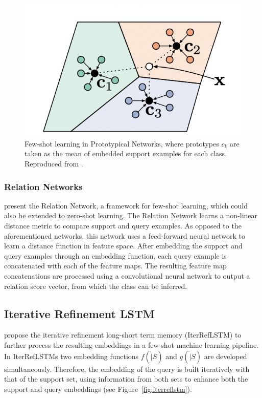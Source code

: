 \begin{figure}[h]
	\centering
	\includegraphics[width=0.7\linewidth]{img/protonets.png}
	\caption{Few-shot learning in Prototypical Networks, where prototypes \textbf{$c_k$} are taken as the mean of embedded support examples for each class. Reproduced from \citet{snell2017prototypical}.}
	\label{fig:protonets}
\end{figure}

\subsubsection{Relation Networks}

\citet{sung2018learning} present the Relation Network, a framework for few-shot learning, which could also be extended to zero-shot learning. The Relation Network learns a non-linear distance metric to compare support and query examples. As opposed to the aforementioned networks, this network uses a feed-forward neural network to learn a distance function in feature space. After embedding the support and query examples through an embedding function, each query example is concatenated with each of the feature maps. The resulting feature map concatenations are processed using a convolutional neural network to output a relation score vector, from which the class can be inferred.

\subsection{Iterative Refinement LSTM}

\citet{altae2017low} propose the iterative refinement long-short term memory (IterRefLSTM) to further process the resulting embeddings in a few-shot machine learning pipeline. In IterRefLSTMs two embedding functions $f(\dot|S)$ and $g(\dot|S)$ are developed simultaneously. Therefore, the embedding of the query is built iteratively with that of the support set, using information from both sets to enhance both the support and query embeddings (see Figure~\ref{fig:iterreflstm}).

